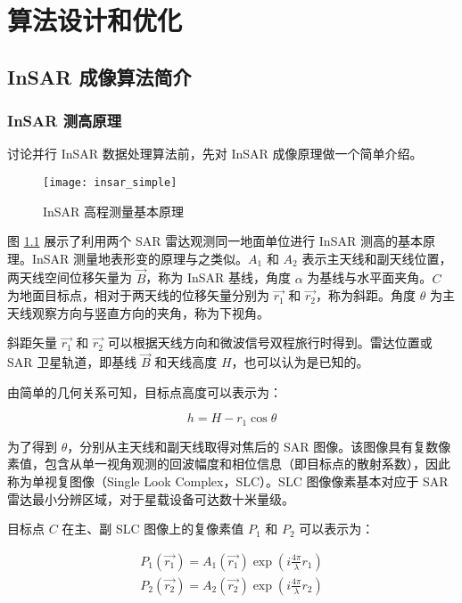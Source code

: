 \chapter{算法设计和优化}

\section{InSAR 成像算法简介}

\subsection{InSAR 测高原理}

讨论并行 InSAR 数据处理算法前，先对 InSAR 成像原理做一个简单介绍。\cite{simons2007interferometric} \cite{ferretti2007insar}

\begin{figure}[ht]
\centering
\texttt{[image: insar\_simple]}
\caption{InSAR 高程测量基本原理} \label{fig:insar_simple}
\end{figure}

图 \ref{fig:insar_simple} 展示了利用两个 SAR 雷达观测同一地面单位进行 InSAR 测高的基本原理。InSAR 测量地表形变的原理与之类似。$A_1$ 和 $A_2$ 表示主天线和副天线位置，两天线空间位移矢量为 $\vec{B}$，称为 InSAR 基线，角度 $\alpha$ 为基线与水平面夹角。$C$ 为地面目标点，相对于两天线的位移矢量分别为 $\vec{r_1}$ 和 $\vec{r_2}$，称为斜距。角度 $\theta$ 为主天线观察方向与竖直方向的夹角，称为下视角。

斜距矢量 $ \vec{r_1} $ 和 $ \vec{r_2} $ 可以根据天线方向和微波信号双程旅行时得到。雷达位置或 SAR 卫星轨道，即基线 $\vec{B}$ 和天线高度 $H$，也可以认为是已知的。

由简单的几何关系可知，目标点高度可以表示为：

\begin{equation}
    h = H - r_1 \cos\theta
\end{equation}

为了得到 $\theta$，分别从主天线和副天线取得对焦后的 SAR 图像。该图像具有复数像素值，包含从单一视角观测的回波幅度和相位信息（即目标点的散射系数），因此称为单视复图像（Single Look Complex，SLC）。SLC 图像像素基本对应于 SAR 雷达最小分辨区域，对于星载设备可达数十米量级\cite{sandwell2011gmtsar}。

目标点 $C$ 在主、副 SLC 图像上的复像素值 $P_1$ 和 $P_2$ 可以表示为：

\begin{equation}
\begin{split}
    P_1(\vec{r_1}) = A_1(\vec{r_1}) \exp(i \frac{4\pi}{\lambda} r_1) \\
    P_2(\vec{r_2}) = A_2(\vec{r_2}) \exp(i \frac{4\pi}{\lambda} r_2) \\
\end{split}
\end{equation}

